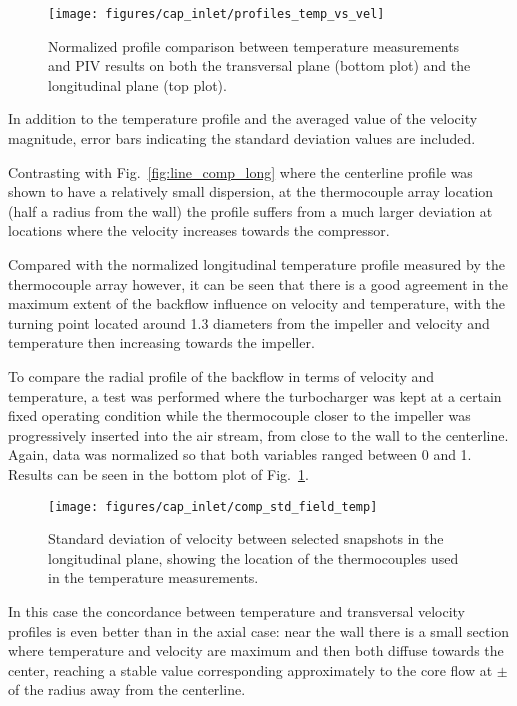 \begin{figure}[t!]
\centering
\texttt{[image: figures/cap\_inlet/profiles\_temp\_vs\_vel]}
\caption[Velocity vs. temperature profile comparison]{Normalized profile comparison between temperature measurements and PIV results on both the transversal plane (bottom plot) and the longitudinal plane (top plot).}
\label{fig:profiles_temp_vs_vel}
\end{figure}

In addition to the temperature profile and the averaged value of the velocity magnitude, error bars indicating the standard deviation values are included.

Contrasting with Fig.~\ref{fig:line_comp_long} where the centerline profile was shown to have a relatively small dispersion, at the thermocouple array location (half a radius from the wall) the profile suffers from a much larger deviation at locations where the velocity increases towards the compressor.

Compared with the normalized longitudinal temperature profile measured by the thermocouple array however, it can be seen that there is a good agreement in the maximum extent of the backflow influence on velocity and temperature, with the turning point located around 1.3 diameters from the impeller and velocity and temperature then increasing towards the impeller.

To compare the radial profile of the backflow in terms of velocity and temperature, a test was performed where the turbocharger was kept at a certain fixed operating condition while the thermocouple closer to the impeller was progressively inserted into the air stream, from close to the wall to the centerline. Again, data was normalized so that both variables ranged between 0 and 1. Results can be seen in the bottom plot of Fig.~\ref{fig:profiles_temp_vs_vel}.

\begin{figure}[t!]
\centering
\texttt{[image: figures/cap\_inlet/comp\_std\_field\_temp]}
\caption[Field of standard deviation of velocity]{Standard deviation of velocity between selected snapshots in the longitudinal plane, showing the location of the thermocouples used in the temperature measurements.}
\label{fig:comp_std_field_temp}
\end{figure}

In this case the concordance between temperature and transversal velocity profiles is even better than in the axial case: near the wall there is a small section where temperature and velocity are maximum and then both diffuse towards the center, reaching a stable value corresponding approximately to the core flow at $\pm$ of the radius away from the centerline.

